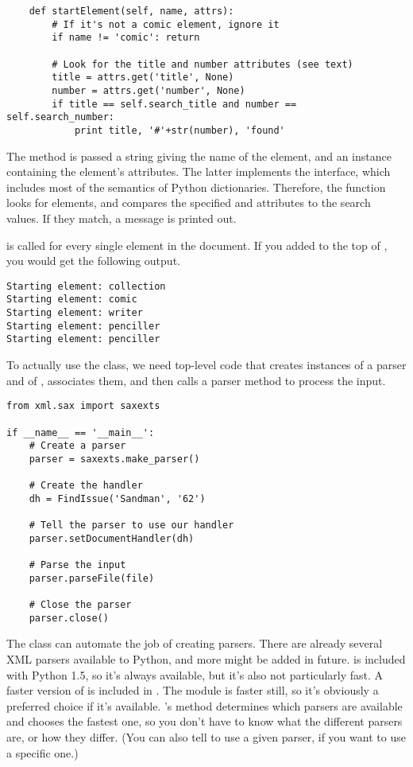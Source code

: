 \documentclass{howto}
\newcommand{\element}[1]{\code{#1}}
\newcommand{\attribute}[1]{\code{#1}}
\begin{document}
\begin{verbatim}
    def startElement(self, name, attrs):
        # If it's not a comic element, ignore it
        if name != 'comic': return

        # Look for the title and number attributes (see text)
        title = attrs.get('title', None)
        number = attrs.get('number', None)
        if title == self.search_title and number == self.search_number:
            print title, '#'+str(number), 'found'
\end{verbatim}

The  method is passed a string giving the name
of the element, and an instance containing the element's attributes.
The latter implements the  interface, which
includes most of the semantics of Python dictionaries.  Therefore, the 
function looks for \element{comic} elements, and compares the
specified \attribute{title} and \attribute{number} attributes to the
search values.  If they match, a message is printed out.

 is called for every single element in the
document.  If you added  to the
top of  , you would get the following output.

\begin{verbatim}
Starting element: collection
Starting element: comic
Starting element: writer
Starting element: penciller
Starting element: penciller
\end{verbatim}

To actually use the class, we need top-level code that creates 
instances of a parser and of , associates them, and
then calls a parser method to process the input.

\begin{verbatim}
from xml.sax import saxexts

if __name__ == '__main__':
    # Create a parser
    parser = saxexts.make_parser()

    # Create the handler
    dh = FindIssue('Sandman', '62')

    # Tell the parser to use our handler
    parser.setDocumentHandler(dh)

    # Parse the input
    parser.parseFile(file)

    # Close the parser
    parser.close()
\end{verbatim}

The  class can automate the job of creating
parsers.  There are already several XML parsers available to Python,
and more might be added in future.   is included with
Python 1.5, so it's always available, but it's also not particularly
fast.  A faster version of  is included in
.  The  module is faster still, so
it's obviously a preferred choice if it's available.
's  method determines
which parsers are available and chooses the fastest one, so you don't
have to know what the different parsers are, or how they differ. (You
can also tell  to use a given parser, if you want
to use a specific one.)
\end{document}
